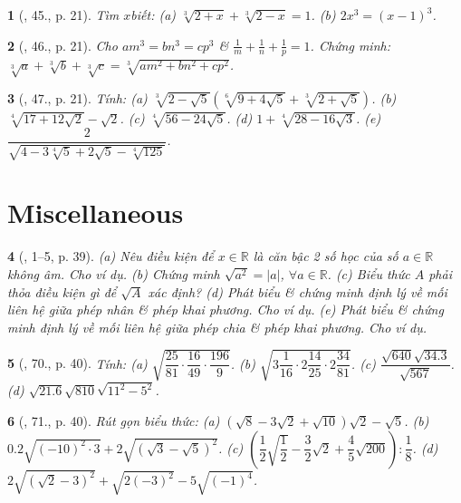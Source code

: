 \documentclass{article}
\newtheorem{baitoan}{}%
\begin{document}
\begin{baitoan}[\cite{Binh_Toan_9_tap_1}, 45., p. 21]
	Tìm $x$biết: (a) $\sqrt[3]{2 + x} + \sqrt[3]{2 - x} = 1$. (b) $2x^3 = (x - 1)^3$.
\end{baitoan}

\begin{baitoan}[\cite{Binh_Toan_9_tap_1}, 46., p. 21]
	Cho $am^3 = bn^3 = cp^3$ \& $\frac{1}{m} + \frac{1}{n} + \frac{1}{p} = 1$. Chứng minh: $\sqrt[3]{a} + \sqrt[3]{b} + \sqrt[3]{c} = \sqrt[3]{am^2 + bn^2 + cp^2}$.
\end{baitoan}

\begin{baitoan}[\cite{Binh_Toan_9_tap_1}, 47., p. 21]
	Tính: (a) $\sqrt[3]{2 - \sqrt{5}}(\sqrt[6]{9 + 4\sqrt{5}} + \sqrt[3]{2 + \sqrt{5}})$. (b) $\sqrt[4]{17 + 12\sqrt{2}} - \sqrt{2}$. (c) $\sqrt[4]{56 - 24\sqrt{5}}$. (d) $1 + \sqrt[4]{28 - 16\sqrt{3}}$. (e) $\dfrac{2}{\sqrt{4 - 3\sqrt[4]{5} + 2\sqrt{5} - \sqrt[4]{125}}}$.
\end{baitoan}


\section{Miscellaneous}

\begin{baitoan}[\cite{SGK_Toan_9_tap_1}, 1--5, p. 39]
	(a) Nêu điều kiện để $x\in\mathbb{R}$ là căn bậc 2 số học của số $a\in\mathbb{R}$ không âm. Cho ví dụ. (b) Chứng minh $\sqrt{a^2} = |a|$, $\forall a\in\mathbb{R}$. (c) Biểu thức $A$ phải thỏa điều kiện gì để $\sqrt{A}$ xác định? (d) Phát biểu \& chứng minh định lý về mối liên hệ giữa phép nhân \& phép khai phương. Cho ví dụ. (e) Phát biểu \& chứng minh định lý về mối liên hệ giữa phép chia \& phép khai phương. Cho ví dụ.
\end{baitoan}

\begin{baitoan}[\cite{SGK_Toan_9_tap_1}, 70., p. 40]
	Tính: (a) $\sqrt{\dfrac{25}{81}\cdot\dfrac{16}{49}\cdot\dfrac{196}{9}}$. (b) $\sqrt{3\dfrac{1}{16}\cdot2\dfrac{14}{25}\cdot2\dfrac{34}{81}}$. (c) $\dfrac{\sqrt{640}\sqrt{34.3}}{\sqrt{567}}$. (d) $\sqrt{21.6}\sqrt{810}\sqrt{11^2 - 5^2}$.
\end{baitoan}

\begin{baitoan}[\cite{SGK_Toan_9_tap_1}, 71., p. 40]
	Rút gọn biểu thức: (a) $(\sqrt{8} - 3\sqrt{2} + \sqrt{10})\sqrt{2} - \sqrt{5}$. (b) $0.2\sqrt{(-10)^2\cdot3} + 2\sqrt{(\sqrt{3} - \sqrt{5})^2}$. (c) $\left(\dfrac{1}{2}\sqrt{\dfrac{1}{2}} - \dfrac{3}{2}\sqrt{2} + \dfrac{4}{5}\sqrt{200}\right):\dfrac{1}{8}$. (d) $2\sqrt{(\sqrt{2} - 3)^2} + \sqrt{2(-3)^2} - 5\sqrt{(-1)^4}$.
\end{baitoan}
\end{document}
